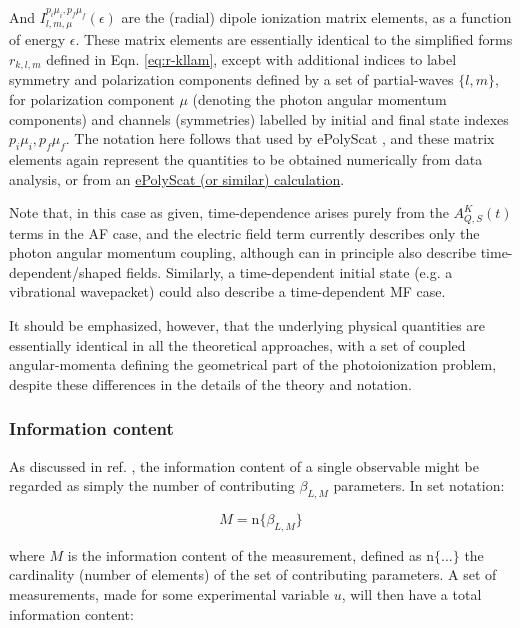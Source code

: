 And \(I_{l,m,\mu}^{p_{i}\mu_{i},p_{f}\mu_{f}}(\epsilon)\) are the (radial) dipole ionization matrix elements, as a function of energy \(\epsilon\). These matrix elements are essentially identical to the simplified forms $r_{k,l,m}$ defined in Eqn. \ref{eq:r-kllam}, except with additional indices to label symmetry and polarization components
defined by a set of partial-waves \(\{l,m\}\), for polarization component \(\mu\) (denoting the photon angular momentum components) and channels (symmetries) labelled by initial and final state indexes \({p_{i}\mu_{i},p_{f}\mu_{f}}\). The notation here follows that used by ePolyScat \cite{Gianturco1994, Lucchese1986, Natalense1999}, and these matrix elements again represent the quantities  to be obtained numerically from data analysis, or from an \href{https://epsproc.readthedocs.io/en/latest/ePS_ePSproc_tutorial/ePS_tutorial_080520.html\#Theoretical-background}{ePolyScat (or similar) calculation}. 

Note that, in this case as given, time-dependence arises purely from the \(A_{Q,S}^{K}(t)\) terms in the AF case, and the electric field term currently describes only the photon angular momentum coupling,
although can in principle also describe time-dependent/shaped fields. Similarly, a time-dependent initial state (e.g. a vibrational wavepacket) could also describe a time-dependent MF case.

It should be emphasized, however, that the underlying physical quantities are essentially identical in all the theoretical approaches, with a set of coupled angular-momenta defining the geometrical part of the photoionization problem, despite these differences in the details of the theory and notation. 




\subsubsection{Information content}

As discussed in ref. \cite{hockett2018QMP2}, the information content of a single observable might be regarded as simply the number of contributing $\beta_{L,M}$ parameters. In set notation:

\begin{equation}
M=\mathrm{n}\{\beta_{L,M}\}
\end{equation}

where $M$ is the information content of the measurement, defined
as $\mathrm{n}\{...\}$ the cardinality (number of elements) of the
set of contributing parameters. A set of measurements, made for some
experimental variable $u$, will then have a total information content:

